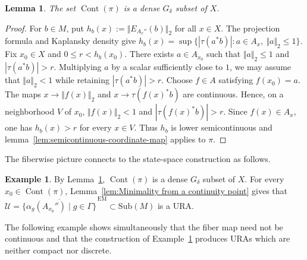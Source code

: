 \documentclass[12pt]{amsart} %
\theoremstyle{plain}
\newtheorem{lemma}[theorem]{Lemma}
\theoremstyle{definition}
\newtheorem{example}[theorem]{Example}
\begin{document}
\begin{lemma}\label{lem:fiber-map-continuity-points}
The set $\operatorname{Cont}(\pi)$ is a dense $G_\delta$ subset of $X$.
\end{lemma}
\begin{proof}
For $b\in M$, put $h_b(x):=\Vert E_{A_x''}(b)\Vert_2$ for all $x\in X$. The projection formula and Kaplansky density give
$h_b(x)=\sup\bigl\{|\tau(a^*b)|:a\in A_x,\ \Vert a\Vert_2\leq1\bigr\}$. Fix $x_0\in X$ and $0\leq r<h_b(x_0)$. There exists $a\in A_{x_0}$ such
that $\Vert a\Vert_2\leq1$ and $|\tau(a^*b)|>r$. Multiplying $a$ by a
scalar sufficiently close to $1$, we may assume that
$\Vert a\Vert_2<1$ while retaining $|\tau(a^*b)|>r$. Choose $f\in A$ satisfying
$f(x_0)=a$. The maps $x\to\Vert f(x)\Vert_2$ and $x\to\tau(f(x)^*b)$
are continuous. Hence, on a neighborhood $V$ of $x_0$,
$\Vert f(x)\Vert_2<1$ and $|\tau(f(x)^*b)|>r$. Since $f(x)\in A_x$, one
has $h_b(x)>r$ for every $x\in V$. Thus $h_b$ is lower semicontinuous and lemma~\ref{lem:semicontinuous-coordinate-map}
applies to $\pi$.
\end{proof}
\noindent The fiberwise picture connects to the state-space construction as follows.
\begin{example}
\label{ex:continuous-field-ura}
By Lemma~\ref{lem:fiber-map-continuity-points},
$\operatorname{Cont}(\pi)$ is a dense $G_\delta$ subset of $X$. For every
$x_0\in\operatorname{Cont}(\pi)$,
Lemma~\ref{lem:Minimality from a continuity point} gives that $\mathcal{U} = \overline{\{ \alpha_g(A_{x_0}'') \mid g \in \Gamma \} }^{\,\mathrm{EM}} \subset \mathrm{Sub}(M)$ is a URA.
\end{example}
\noindent The following example shows simultaneously that the fiber map
need not be continuous and that the construction of
Example~\ref{ex:continuous-field-ura} produces URAs which are neither
compact nor discrete.
\end{document}

